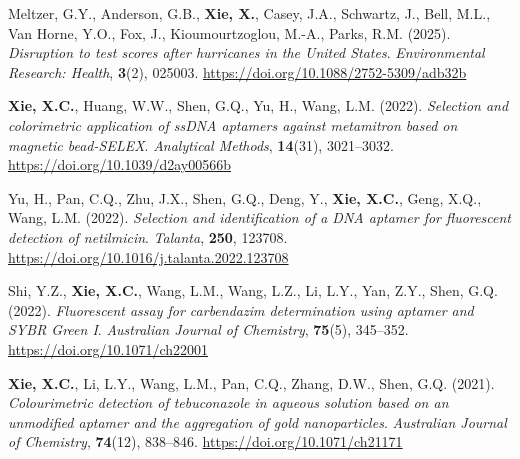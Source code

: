 \documentclass[11pt,a4paper,sans]{moderncv}
\begin{document}
\medskip

\noindent Meltzer, G.Y., Anderson, G.B., \textbf{Xie, X.}, Casey, J.A., Schwartz, J., Bell, M.L., Van Horne, Y.O., Fox, J., Kioumourtzoglou, M.-A., Parks, R.M. (2025). \textit{Disruption to test scores after hurricanes in the United States}. \textit{Environmental Research: Health}, \textbf{3}(2), 025003. \href{https://doi.org/10.1088/2752-5309/adb32b}{https://doi.org/10.1088/2752-5309/adb32b}

\medskip

\noindent \textbf{Xie, X.C.}, Huang, W.W., Shen, G.Q., Yu, H., Wang, L.M. (2022). \textit{Selection and colorimetric application of ssDNA aptamers against metamitron based on magnetic bead-SELEX}. \textit{Analytical Methods}, \textbf{14}(31), 3021–3032. \href{https://doi.org/10.1039/d2ay00566b}{https://doi.org/10.1039/d2ay00566b}

\medskip

\noindent Yu, H., Pan, C.Q., Zhu, J.X., Shen, G.Q., Deng, Y., \textbf{Xie, X.C.}, Geng, X.Q., Wang, L.M. (2022). \textit{Selection and identification of a DNA aptamer for fluorescent detection of netilmicin}. \textit{Talanta}, \textbf{250}, 123708. \href{https://doi.org/10.1016/j.talanta.2022.123708}{https://doi.org/10.1016/j.talanta.2022.123708}
\medskip

\noindent Shi, Y.Z., \textbf{Xie, X.C.}, Wang, L.M., Wang, L.Z., Li, L.Y., Yan, Z.Y., Shen, G.Q. (2022). \textit{Fluorescent assay for carbendazim determination using aptamer and SYBR Green I}. \textit{Australian Journal of Chemistry}, \textbf{75}(5), 345–352. \href{https://doi.org/10.1071/ch22001}{https://doi.org/10.1071/ch22001}
\medskip

\noindent \textbf{Xie, X.C.}, Li, L.Y., Wang, L.M., Pan, C.Q., Zhang, D.W., Shen, G.Q. (2021). \textit{Colourimetric detection of tebuconazole in aqueous solution based on an unmodified aptamer and the aggregation of gold nanoparticles}. \textit{Australian Journal of Chemistry}, \textbf{74}(12), 838–846. \href{https://doi.org/10.1071/ch21171}{https://doi.org/10.1071/ch21171}
\end{document}
